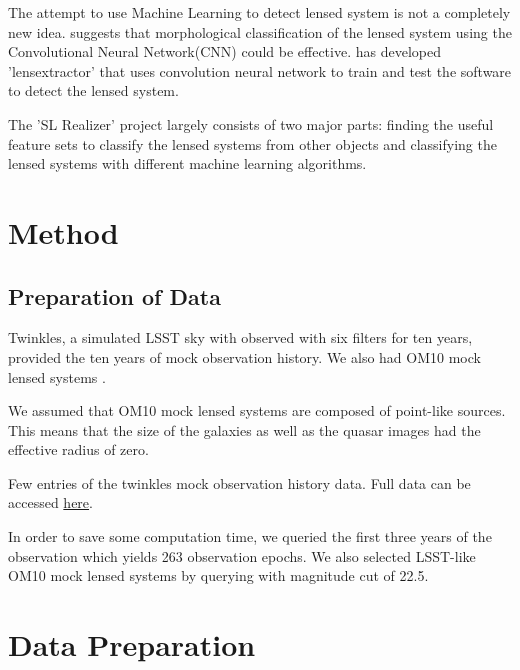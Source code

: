 \documentclass[\docopts]{\docclass}
\begin{document}
The attempt to use Machine Learning to detect lensed system is not a completely new idea. \citep{convolution_neural_network} suggests that morphological classification of the lensed system using the Convolutional Neural Network(CNN) could be effective. \citep{LensExtractor} has developed 'lensextractor' that uses convolution neural network to train and test the software to detect the lensed system.

The 'SL Realizer' project largely consists of two major parts: finding the useful feature sets to classify the lensed systems from other objects and classifying the lensed systems with different machine learning algorithms. 



\section{Method}
\label{sec:method}

\subsection{Preparation of Data}
\label{subsec:dataprep}

Twinkles, a simulated LSST sky with observed with six filters for ten years, provided the ten years of mock observation history. We also had OM10 mock lensed systems \cite{TimeDelayOverall}. 

We assumed that OM10 mock lensed systems are composed of point-like sources. This means that the size of the galaxies as well as the quasar images had the effective radius of zero.

\begin{table}[!h]
\caption{Few entries of the twinkles mock observation history data. Full data can be accessed \href{https://github.com/jennykim1016/SLRealizer/blob/master/data/twinkles_observation_history.csv}{here}.}
\end{table}

In order to save some computation time, we queried the first three years of the observation which yields 263 observation epochs. We also selected LSST-like OM10 mock lensed systems by querying with magnitude cut of 22.5. 


\section{Data Preparation}
\label{sssec:catalog}
\end{document}
